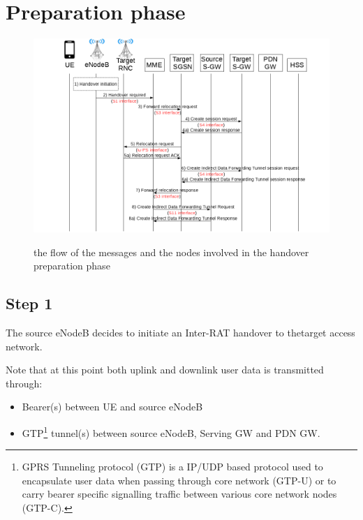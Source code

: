 \section{Preparation phase}
\begin{figure}[htb]
	\centering
	\includegraphics[width=1\linewidth]{img/preparation-phase.png}
	\label{fig:preparation-phase}
	\caption{the flow of the messages and the nodes involved in the
	handover preparation phase}
\end{figure}

\subsection*{Step 1}
The source eNodeB decides to initiate an Inter-RAT handover to thetarget access network.

Note that at this point both uplink and downlink user data is transmitted through:
\begin{itemize}
	\item Bearer(s) between UE and source eNodeB
	\item GTP\footnote{GPRS Tunneling protocol (GTP) is a IP/UDP based protocol used to
	encapsulate user data when passing through core network (GTP-U) or to carry bearer
	specific signalling traffic between various core network nodes (GTP-C).} tunnel(s)
	between	source eNodeB, Serving GW and PDN GW.
\end{itemize}


